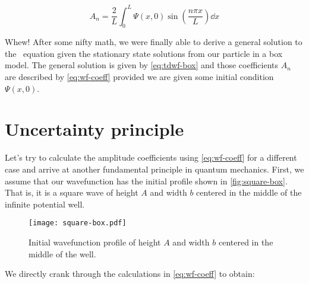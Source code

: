 \begin{tcolorbox}[title = Wavefunction expansion coefficients] \vspace{-2ex}
	\begin{equation}
		A_n = \frac{2}{L} \int_0^L \Psi(x,0) \sin \left(\frac{n\pi x}{L}\right) \dd{x} \label{eq:wf-coeff}
	\end{equation}
\end{tcolorbox}

Whew! After some nifty math, we were finally able to derive a general solution to the \Sch\ equation given the stationary state solutions from our particle in a box model. 
The general solution is given by \autoref{eq:tdwf-box} and those coefficients $A_n$ are described by \autoref{eq:wf-coeff} provided we are given some initial condition $\Psi(x,0)$.


\section{Uncertainty principle}

Let's try to calculate the amplitude coefficients using \autoref{eq:wf-coeff} for a different case and arrive at another fundamental principle in quantum mechanics. 
First, we assume that our wavefunction has the initial profile shown in \autoref{fig:square-box}. 
That is, it is a square wave of height $A$ and width $b$ centered in the middle of the infinite potential well.

\begin{figure}[!h]
	\centering
	\texttt{[image: square-box.pdf]}
	\caption{Initial wavefunction profile of height $A$ and width $b$ centered in the middle of the well.}
	\label{fig:square-box}
\end{figure}

We directly crank through the calculations in \autoref{eq:wf-coeff} to obtain:

